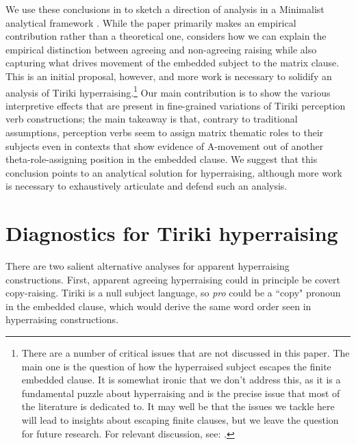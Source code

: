 \documentclass[output=paper,colorlinks,citecolor=brown
]{langscibook}
\begin{document}
We use these conclusions in  to sketch a direction of analysis in a Minimalist analytical framework \citep{Chomsky:2000:MI,Chomsky:2001:DbP}. While the paper primarily makes an empirical contribution rather than a theoretical one,  considers how we can explain the empirical distinction between agreeing and non-agreeing raising while also capturing what drives movement of the embedded subject to the matrix clause. This is an initial proposal, however, and more work is necessary to solidify an analysis of Tiriki hyperraising.\footnote{There are a number of critical issues that are not discussed in this paper. The main one is the question of how the hyperraised subject escapes the finite embedded clause. It is somewhat ironic that we don't address this, as it is a fundamental puzzle about hyperraising and is the precise issue that most of the literature is dedicated to. It may well be that the issues we tackle here will lead to insights about escaping finite clauses, but we leave the question for future research. For relevant discussion, see: \citet{MartinsNunes2005BpHyperRaising,Nunes2008BpHyperRaising,BoeckxHornsteinNunes:2010,MartinsNunes2010ApparentHyperRaising,ObataEpstein:2011:FeatureSplittingMerge,CarstensDiercks:2013:Hyper-Raising,Fong:2018:MongolianHyperRaising,Fong2019HyperRaisingGlossa,Deal:2017:HyperRaisingNezPerce,Zyman2023HRoverview,}.} Our main contribution is to show the various interpretive effects that are present in fine-grained variations of Tiriki perception verb constructions; the main takeaway is that, contrary to traditional assumptions, perception verbs seem to assign matrix thematic roles to their subjects even in contexts that show evidence of A-movement out of another theta-role-assigning position in the embedded clause. We suggest that this conclusion points to an analytical solution for hyperraising, although more work is necessary to exhaustively articulate and defend such an analysis.

\section{Diagnostics for Tiriki hyperraising \citep{diercksetal2022luyia}} \label{sec:johnson:TirikiRaisingBackground}

There are two salient alternative analyses for apparent hyperraising constructions. First, apparent agreeing hyperraising could in principle be covert copy-raising.  Tiriki is a null subject language, so \textit{pro} could be a ``copy" pronoun in the embedded clause, which would derive the same word order seen in hyperraising constructions.
\end{document}
